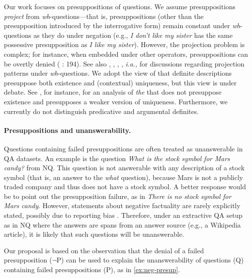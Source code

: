 \documentclass[11pt,a4paper]{article}
\begin{document}
\noindent Our work focuses on presuppositions of questions. We assume presuppositions \textit{project} from \textit{wh}-questions---that is, presuppositions (other than the presupposition introduced by the interrogative form) remain constant under \textit{wh}-questions as they do under negation (e.g., \textit{I don't like my sister} has the same possessive presupposition as \textit{I like my sister}). However, the projection problem is complex; for instance, when embedded under other operators, presuppositions can be overtly denied (\citeauthor{levinson_1983} \citeyear{levinson_1983}: 194). See also \citet{schlenker2008presupposition}, \citet{abrusan2011presuppositional}, \citet{schwarz2018decomposing}, \citet{theiler2020epistemic}, \textit{i.a.,} for discussions regarding projection patterns under \textit{wh}-questions. We adopt the view of \citet{strawson1950referring} that definite descriptions presuppose both existence and (contextual) uniqueness, but this view is under debate. See \citet{coppock2012weak}, for instance, for an analysis of \textit{the} that does not presuppose existence and presupposes a weaker version of uniqueness. Furthermore, we currently do not distinguish predicative and argumental definites.


\paragraph{Presuppositions and unanswerability.} Questions containing failed presuppositions are often treated as unanswerable in QA datasets. An example is the question \textit{What is the stock symbol for Mars candy?} from NQ. This question is not answerable with any description of a stock symbol (that is, an answer to the \textit{what} question), because Mars is not a publicly traded company and thus does not have a stock symbol. A better response would be to point out the presupposition failure, as in \textit{There is no stock symbol for Mars candy}. However, statements about negative factuality are rarely explicitly stated, possibly due to reporting bias \citep{gordon2013reporting}. Therefore, under an extractive QA setup as in NQ where the answers are spans from an answer source (e.g., a Wikipedia article), it is likely that such questions will be unanswerable.

Our proposal is based on the observation that the denial of a failed presupposition ($\neg$P) can be used to explain the unanswerability of questions (Q) containing failed presuppositions (P), as in \ref{ex:neg-presup}.
\end{document}
